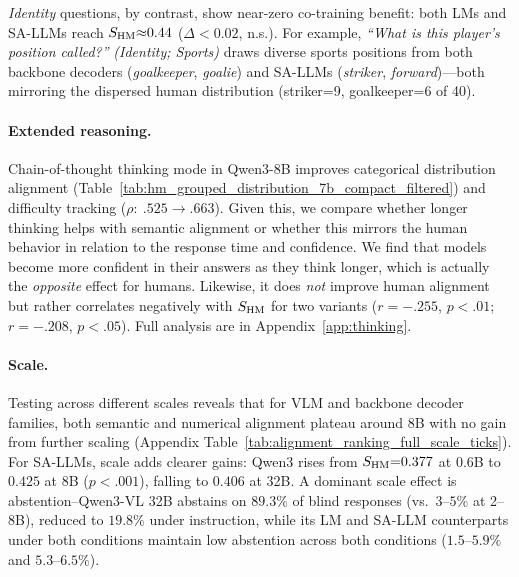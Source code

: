 \documentclass[letterpaper]{article}
\begin{document}
\textit{Identity} questions, by contrast, show near-zero co-training benefit: both LMs and SA-LLMs reach $\sHM{\approx}0.44$ ($\Delta{<}0.02$, n.s.). %
For example, \textit{``What is this player's position called?''} \emph{(Identity; Sports)} draws diverse sports positions from both backbone decoders (\textit{goalkeeper}, \textit{goalie}) and SA-LLMs (\textit{striker}, \textit{forward})---both mirroring the dispersed human distribution (striker=9, goalkeeper=6 of 40).

\paragraph{Extended reasoning.} %
Chain-of-thought thinking mode in Qwen3-8B improves categorical distribution alignment
(Table~\ref{tab:hm_grouped_distribution_7b_compact_filtered}) and difficulty tracking
($\rho{:}~.525{\to}.663$). %
Given this, we compare whether longer thinking helps with semantic alignment or whether this mirrors the human behavior in relation to the response time and confidence. %
We find that models become more confident in their answers as they think longer, which is actually the \emph{opposite} effect for humans. %
Likewise, it does \emph{not} improve human alignment but rather correlates negatively with $\sHM$ for two variants ($r{=}{-}.255$, $p{<}.01$; $r{=}{-}.208$, $p{<}.05$). %
Full analysis are in Appendix~\ref{app:thinking}. 

\paragraph{Scale.} 
Testing across different scales reveals that for VLM and backbone decoder families, both semantic and numerical alignment plateau around 8B with no gain from further scaling (Appendix Table~\ref{tab:alignment_ranking_full_scale_ticks}).
For SA-LLMs, scale adds clearer gains: Qwen3 rises from $\sHM{=}0.377$ at 0.6B to $0.425$ at 8B ($p{<}.001$), falling to $0.406$ at 32B.
A dominant scale effect is abstention--Qwen3-VL 32B abstains on $89.3\%$ of blind responses (vs.\ $3$--$5\%$ at 2--8B), reduced to $19.8\%$ under instruction, while its LM and SA-LLM counterparts under both conditions maintain low abstention across both conditions ($1.5$--$5.9\%$ and $5.3$--$6.5\%$).
\end{document}
